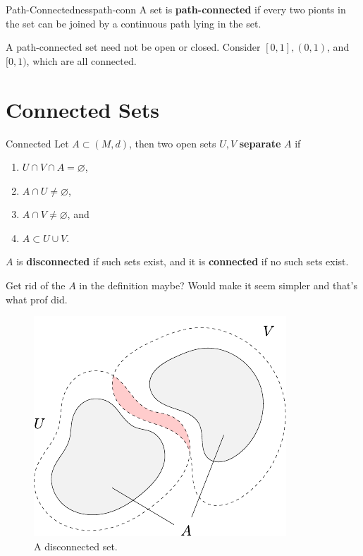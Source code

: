 \documentclass[10pt]{report}
\begin{document}
\begin{defn}{Path-Connectedness}{path-conn}
	A set is \textbf{path-connected} if every two pionts in the set can be joined by a continuous path lying in the set.
\end{defn}

A path-connected set need not be open or closed. Consider $[0,1], (0,1)$, and $[0,1)$, which are all connected.



\section{Connected Sets}

\begin{defn}{Connected}{}
	Let $A \subset (M,d)$, then two open sets $U,V$ \textbf{separate} $A$ if
	\begin{enumerate}
		\item $U \cap V \cap A = \varnothing$,
		\item $A \cap U \neq \varnothing$,
		\item $A \cap V \neq \varnothing$, and
		\item $A \subset U \cup V$.
	\end{enumerate}
	$A$ is \textbf{disconnected} if such sets exist, and it is \textbf{connected} if no such sets exist.
\end{defn}
{\color{red}Get rid of the $A$ in the definition maybe? Would make it seem simpler and that's what prof did.}

\begin{figure}[H]
	\centering
	\includegraphics[scale=1]{fig/disconnected.pdf}
	\caption{A disconnected set.}
\end{figure}
\end{document}
